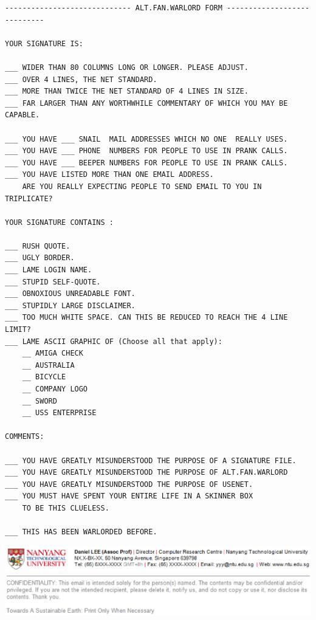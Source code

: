 \documentclass[a4paper,landscape,headrule,footrule,xetex]{foils}
\begin{document}
\hspace*{-5mm}\begin{small}
\begin{verbatim}
----------------------------- ALT.FAN.WARLORD FORM ----------------------------

YOUR SIGNATURE IS:

___ WIDER THAN 80 COLUMNS LONG OR LONGER. PLEASE ADJUST.
___ OVER 4 LINES, THE NET STANDARD.
___ MORE THAN TWICE THE NET STANDARD OF 4 LINES IN SIZE.
___ FAR LARGER THAN ANY WORTHWHILE COMMENTARY OF WHICH YOU MAY BE CAPABLE.

___ YOU HAVE ___ SNAIL  MAIL ADDRESSES WHICH NO ONE  REALLY USES.
___ YOU HAVE ___ PHONE  NUMBERS FOR PEOPLE TO USE IN PRANK CALLS.
___ YOU HAVE ___ BEEPER NUMBERS FOR PEOPLE TO USE IN PRANK CALLS.
___ YOU HAVE LISTED MORE THAN ONE EMAIL ADDRESS.
    ARE YOU REALLY EXPECTING PEOPLE TO SEND EMAIL TO YOU IN TRIPLICATE?

YOUR SIGNATURE CONTAINS :

___ RUSH QUOTE.
___ UGLY BORDER.
___ LAME LOGIN NAME.
___ STUPID SELF-QUOTE.
___ OBNOXIOUS UNREADABLE FONT.
___ STUPIDLY LARGE DISCLAIMER.
___ TOO MUCH WHITE SPACE. CAN THIS BE REDUCED TO REACH THE 4 LINE LIMIT?
___ LAME ASCII GRAPHIC OF (Choose all that apply):
    __ AMIGA CHECK
    __ AUSTRALIA
    __ BICYCLE
    __ COMPANY LOGO
    __ SWORD
    __ USS ENTERPRISE

COMMENTS:

___ YOU HAVE GREATLY MISUNDERSTOOD THE PURPOSE OF A SIGNATURE FILE.
___ YOU HAVE GREATLY MISUNDERSTOOD THE PURPOSE OF ALT.FAN.WARLORD
___ YOU HAVE GREATLY MISUNDERSTOOD THE PURPOSE OF USENET.
___ YOU MUST HAVE SPENT YOUR ENTIRE LIFE IN A SKINNER BOX 
    TO BE THIS CLUELESS.

___ THIS HAS BEEN WARLORDED BEFORE.
\end{verbatim}
\end{small}


\begin{center}
  \includegraphics[width=\textwidth]{../pics/sig_ntu}
  \includegraphics[width=\textwidth]{../pics/disclaimer}
\end{center}
\end{document}
